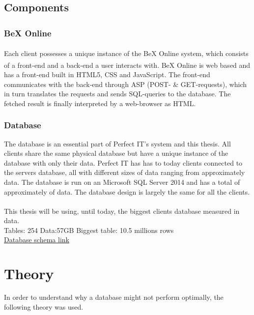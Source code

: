 \documentclass{cslthse-msc}
\begin{document}
\subsection{Components}
\subsubsection{BeX\textsuperscript{\textregistered} Online}
Each client possesses a unique instance of the BeX\textsuperscript{\textregistered} Online system, which consists of a front-end and a back-end a user interacts with. BeX\textsuperscript{\textregistered} Online is web based and has a front-end built in HTML5, CSS and JavaScript. The front-end communicates with the back-end through ASP (POST- \& GET-requests), which in turn translates the requests and sends SQL-queries to the database. The fetched result is finally interpreted by a web-browser as HTML. 
\subsubsection{Database}
The database is an essential part of Perfect IT's system and this thesis. All clients share the same physical database but have a unique instance of the database with only their data.  Perfect IT has has to today  clients connected to the servers database, all with different sizes of data ranging from approximately  data. The database is run on an Microsoft SQL Server 2014 and has a total of approximately  of data. The database design is largely the same for all the clients.\\\\ 
This thesis will be using, until today, the biggest clients database measured in data.\\  Tables: 254 Data:57GB Biggest table: 10.5 millions rows
\\\href{https://drive.google.com/file/d/0B1IYTmE2hnD-eGQ0N2tvYXZNNVE/view?usp=sharing}{Database schema link}

\section{Theory}
In order to understand why a database might not perform optimally, the following theory was used.
\end{document}
